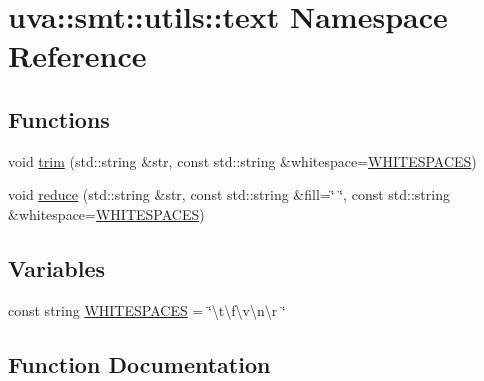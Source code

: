 \hypertarget{namespaceuva_1_1smt_1_1utils_1_1text}{}\section{uva\+:\+:smt\+:\+:utils\+:\+:text Namespace Reference}
\label{namespaceuva_1_1smt_1_1utils_1_1text}
\subsection*{Functions}
\begin{DoxyCompactItemize}
\item 
void \hyperlink{namespaceuva_1_1smt_1_1utils_1_1text_a503e3fe0a1b6e85afccb16ea257069ec}{trim} (std\+::string \&str, const std\+::string \&whitespace=\hyperlink{namespaceuva_1_1smt_1_1utils_1_1text_a1251cf45616a5bc009c8dfb643b794e1}{W\+H\+I\+T\+E\+S\+P\+A\+C\+E\+S})
\item 
void \hyperlink{namespaceuva_1_1smt_1_1utils_1_1text_a59495b5dced26bf68dcc3eec15d16fcd}{reduce} (std\+::string \&str, const std\+::string \&fill=\char`\"{} \char`\"{}, const std\+::string \&whitespace=\hyperlink{namespaceuva_1_1smt_1_1utils_1_1text_a1251cf45616a5bc009c8dfb643b794e1}{W\+H\+I\+T\+E\+S\+P\+A\+C\+E\+S})
\end{DoxyCompactItemize}
\subsection*{Variables}
\begin{DoxyCompactItemize}
\item 
const string \hyperlink{namespaceuva_1_1smt_1_1utils_1_1text_a1251cf45616a5bc009c8dfb643b794e1}{W\+H\+I\+T\+E\+S\+P\+A\+C\+E\+S} = \char`\"{}\textbackslash{}t\textbackslash{}f\textbackslash{}v\textbackslash{}n\textbackslash{}r \char`\"{}
\end{DoxyCompactItemize}


\subsection{Function Documentation}
\hypertarget{namespaceuva_1_1smt_1_1utils_1_1text_a59495b5dced26bf68dcc3eec15d16fcd}{}
